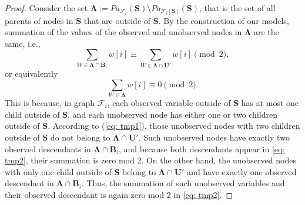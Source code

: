 \documentclass[accepted]{uai2022}
\newcommand{\Pa}[2]{\textit{Pa}_{#2}(#1)}
\newcommand{\U}[0]{\mathbf{U}}
\newcommand{\B}[0]{\mathbf{B}}
\newcommand{\F}[0]{\mathcal{F}}
\begin{document}
\begin{proof}
        Consider the set $\mathbf{\Lambda}:=\Pa{\mathbf{S}}{\F_i}\setminus \Pa{\mathbf{S}}{\F_i[\mathbf{S}]}$, that is the set of all parents of nodes in $\textbf{S}$ that are outside of $\textbf{S}$. By the construction of our models, summation of the values of the observed and unobserved nodes in $\mathbf{\Lambda}$ are the same, i.e.,  
        \begin{equation*}
            \sum_{W \in \mathbf{\Lambda}\cap \B_i} w[i] \equiv \sum_{W \in \mathbf{\Lambda}\cap \U'} w[i] \pmod{2},
        \end{equation*}
        or equivalently
        \begin{equation}\label{eq: tmp2}
            \sum_{W \in \mathbf{\Lambda}} w[i] \equiv 0 \pmod{2}.
        \end{equation}
        This is because, in graph $\F_i$, each observed variable outside of $\mathbf{S}$ has at most one child outside of $\mathbf{S}$, and each unobserved node has either one or two children outside of $\mathbf{S}$. 
        According to (\ref{eq: tmp1}), those unobserved nodes with two children outside of $\mathbf{S}$ do not belong to $\mathbf{\Lambda}\cap \U'$. 
        Such unobserved nodes have exactly two observed descendants in $\mathbf{\Lambda}\cap \B_i$, and because both descendants appear in \eqref{eq: tmp2}, their summation is zero mod 2. 
        On the other hand, the unobserved nodes with only one child outside of $\mathbf{S}$ belong to $\mathbf{\Lambda}\cap \U'$ and have exactly one observed descendant in $\mathbf{\Lambda}\cap \B_i$. Thus, the summation of such unobserved variables and their observed descendant is again zero mod 2 in \eqref{eq: tmp2}.
 

\end{proof}
\end{document}
